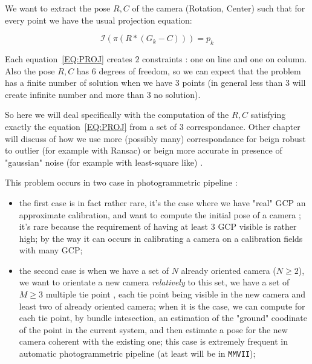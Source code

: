 We want to extract the pose $R,C$ of the camera (Rotation, Center) such that for every point
we have the usual projection equation:

\begin{equation}
       \mathcal I(\pi (R*(G_k-C))) = p_k \label{EQ:PROJ}
\end{equation}


Each equation~\ref{EQ:PROJ}  creates $2$ constraints : one on line and one on column.
Also the pose $R,C$ has $6$ degrees of freedom, so we can expect that the problem has
a finite number of solution when we have $3$ points (in general less than $3$ will create
infinite number and more than $3$ no solution).

So here we will deal specifically  with the computation of the $R,C$ satisfying
exactly the equation~\ref{EQ:PROJ}  from a set of $3$ correspondance. Other
chapter will discuss of how we use more (possibly many) correspondance for beign 
robust to outlier (for
example with Ransac) or beign more accurate in presence of "gaussian" noise (for 
example with least-square like) .


This problem occurs in two case in photogrammetric pipeline :

\begin{itemize}
   \item the first case is in fact rather rare, it's the case where we have "real" GCP
         an approximate calibration, and want to compute the initial pose of a camera ;
         it's rare because the requirement of having at least $3$ GCP visible is rather
         high; by the way it can occurs in calibrating a camera on a calibration fields
         with many GCP;

 \item the second case is when we have a set of $N$ already oriented camera  ($N\geq 2 $),
       we want to orientate a new camera \emph{relatively} to this set, we have a
       set of $M \geq 3$ multiple tie point , each tie point being visible in the new
       camera and least two of already oriented camera;  when it is the case,
       we can compute for each tie point, by bundle intesection, an estimation of the
       "ground" coodinate of the point in the current system, and then estimate a pose
       for the new camera coherent with the existing one;
       this case is extremely frequent in automatic photogrammetric
       pipeline (at least will be in {\tt MMVII});

\end{itemize}


